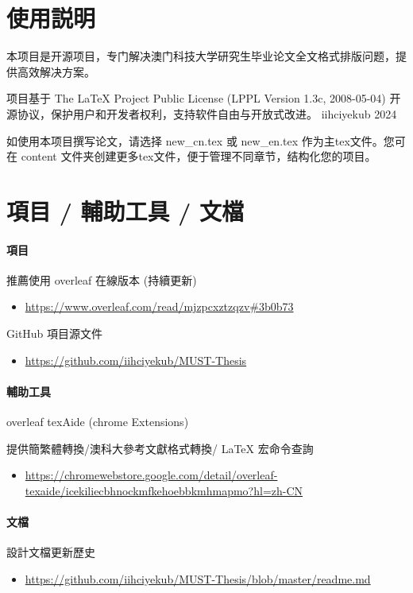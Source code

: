 \documentclass[
    writingLanguage=chinese, %
    addPageTitle=on,  %
    addDeclaration=on, %
    addMUSTlogo=on, %
    addFigTOC=on, %
    addTabTOC=on, %
    refIndent=off, %
    printMod=off, %
]{.def/must}
\begin{document}
\addtableofcontents


\chapter{使用説明}
本项目是开源项目，专门解决澳门科技大学研究生毕业论文全文格式排版问题，提供高效解决方案。

项目基于 The LaTeX Project Public License (LPPL Version 1.3c, 2008-05-04) 开源协议，保护用户和开发者权利，支持软件自由与开放式改进。 \faCopyright iihciyekub 2024

如使用本项目撰写论文，请选择 new\_cn.tex 或 new\_en.tex 作为主tex文件。您可在 content 文件夹创建更多tex文件，便于管理不同章节，结构化您的项目。

\chapter{項目 / 輔助工具 / 文檔}
\subsubsection{項目}

\noindent \faLeaf\; 推薦使用 overleaf 在線版本 (持續更新) 
\begin{itemize}
    \item \url{https://www.overleaf.com/read/mjzpcxztzqzv#3b0b73}
\end{itemize}

\noindent \faGithub\;  GitHub 項目源文件 
\begin{itemize}
    \item \url{https://github.com/iihciyekub/MUST-Thesis}
\end{itemize}


\subsubsection{輔助工具}

\noindent \faChrome\; overleaf texAide (chrome Extensions) 

提供簡繁體轉換/澳科大參考文獻格式轉換/ \LaTeX{} 宏命令查詢 
\begin{itemize}
    \item \url{https://chromewebstore.google.com/detail/overleaf-texaide/icekiliecbhnockmfkehoebbkmhmapmo?hl=zh-CN}
\end{itemize}



\subsubsection{文檔}
\noindent \faHistory\; 設計文檔更新歷史 
\begin{itemize}
    \item \url{https://github.com/iihciyekub/MUST-Thesis/blob/master/readme.md}
\end{itemize}
\end{document}
